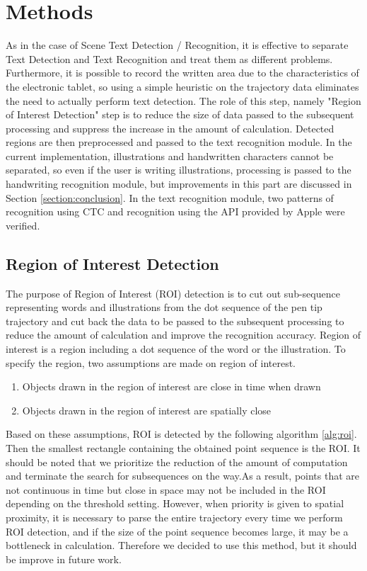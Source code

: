 \section{Methods}
\label{section:methods}

As in the case of Scene Text Detection / Recognition, it is effective to separate Text Detection
and Text Recognition and treat them as different problems.
Furthermore, it is possible to record the written area due to the characteristics of the electronic tablet,
so using a simple heuristic on the trajectory data eliminates the need to actually perform text detection.
The role of this step, namely "Region of Interest Detection" step is to reduce the size of data
passed to the subsequent processing and suppress the increase in the amount of calculation.
Detected regions are then preprocessed and passed to the text recognition module.
In the current implementation, illustrations and handwritten characters cannot be separated,
so even if the user is writing illustrations, processing is passed to the handwriting recognition module,
but improvements in this part are discussed in Section \ref{section:conclusion}.
In the text recognition module,
two patterns of recognition using CTC and recognition using the API provided by Apple were verified.

\subsection{Region of Interest Detection}

The purpose of Region of Interest (ROI) detection is to cut out sub-sequence
representing words and illustrations from the dot sequence of the pen tip trajectory
and cut back the data to be passed to the subsequent processing to
reduce the amount of calculation and improve the recognition accuracy.
Region of interest is a region including a dot sequence of the word or the illustration.
To specify the region, two assumptions are made on region of interest.

\begin{enumerate}
    \item Objects drawn in the region of interest are close in time when drawn
    \item Objects drawn in the region of interest are spatially close
\end{enumerate}

Based on these assumptions, ROI is detected by the following algorithm \ref{alg:roi}.
Then the smallest rectangle containing the obtained point sequence is the ROI.
It should be noted that we prioritize the reduction of the amount of computation and
terminate the search for subsequences on the way.As a result, points that are not continuous
in time but close in space may not be included in the ROI depending on the threshold setting.
However, when priority is given to spatial proximity, it is necessary to parse the entire
trajectory every time we perform ROI detection, and if the size of the point sequence becomes large,
it may be a bottleneck in calculation. Therefore we decided to use this method, but it should
be improve in future work.

